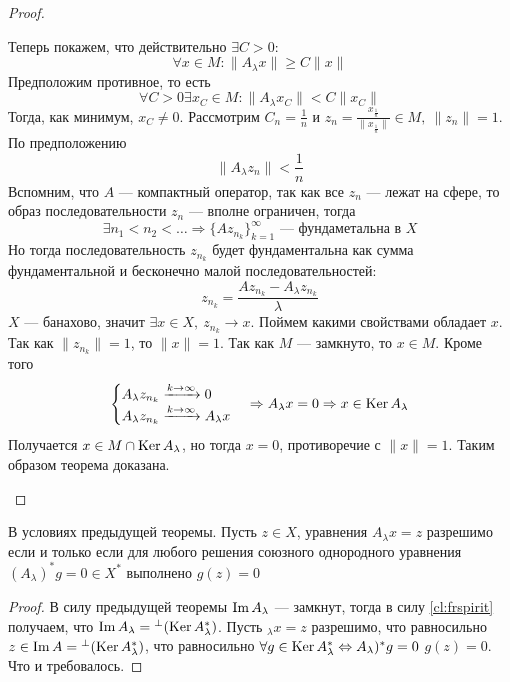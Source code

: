 \begin{proof}
\begin{enumerate}
		Теперь покажем, что действительно $\exists C>0$:
		$$
		\forall x \in M\colon \|A_\lambda x\| \geq C\|x\| 
		$$
		Предположим противное, то есть 
		$$
		\forall C > 0 \exists x_C \in M\colon \|A_\lambda x_C\| < C\|x_C\|
		$$
		Тогда, как минимум, $x_C \neq 0$. Рассмотрим $C_n = \displaystyle\frac{1}{n}$ и $z_n = \displaystyle\frac{x_{\frac{1}{n}}}{\|x_{\frac{1}{n}}\|} \in M, \ \|z_n\| = 1$. По предположению 
		$$
		\|A_\lambda z_n \| < \frac{1}{n} 
		$$
		Вспомним, что $A$ --- компактный оператор, так как все $z_n$ --- лежат на сфере, то образ последовательности $z_n$ --- вполне ограничен, тогда 
		$$
		\exists n_1 < n_2 < \dots \Rightarrow \{A z_{n_k} \}_{k=1}^\infty\text{ --- фундаметальна в $X$}
		$$
		Но тогда последовательность $z_{n_k}$ будет фундаментальна как сумма фундаментальной и бесконечно малой последовательностей:
		$$
		z_{n_k} = \frac{A z_{n_k} - A_\lambda z_{n_k}}{\lambda}
		$$
		$X$ --- банахово, значит $\exists x \in X, \ z_{n_k} \to x$. Поймем какими свойствами обладает $x$. Так как $\|z_{n_k}\| = 1$, то $\|x\| = 1$. Так как $M$ --- замкнуто, то $x \in M$. Кроме того 
		$$
		\begin{cases}
			A_\lambda z_{n_k} \xrightarrow{k \to \infty} 0 \\
			A_\lambda z_{n_k} \xrightarrow{k \to \infty} A_\lambda x
		\end{cases} \Rightarrow A_\lambda x = 0 \Rightarrow x \in \operatorname{Ker} A_\lambda
		$$
		Получается $x \in M \cap \operatorname{Ker} A_\lambda$, но тогда $x = 0$, противоречие с $\|x\| = 1$. Таким образом теорема доказана. 
	\end{enumerate}	
\end{proof}
\begin{next0}
	В условиях предыдущей теоремы. Пусть $z \in X$, уравнения  $A_\lambda x = z$ разрешимо если и только если для любого решения союзного однородного уравнения $(A_\lambda)^*g = 0 \in X^*$ выполнено $g(z) = 0$
\end{next0}
\begin{proof}
	В силу предыдущей теоремы $\operatorname{Im} A_\lambda$ --- замкнут, тогда в силу \ref{cl:frspirit} получаем, что $\operatorname{Im} A_\lambda = {}^\perp (\operatorname{Ker} A_\lambda^*)$. Пусть $_\lambda x = z$ разрешимо, что равносильно $z \in \operatorname{Im} A = {}^\perp (\operatorname{Ker} A_\lambda^*)$, что равносильно $\forall g \in \operatorname{Ker} A_\lambda^* \Leftrightarrow A_\lambda)^*g = 0$ $g(z) = 0$. Что и требовалось. 
\end{proof}
